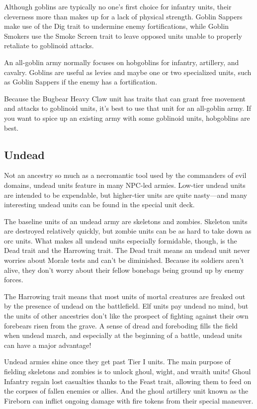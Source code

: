 \documentclass[10pt,a4paper,twoside,bg=print,twocolumn,openany,nodeprecatedcode]{dndbook}
\begin{document}
Although goblins are typically no one's first choice for infantry units, their cleverness more than makes up for a lack of physical strength. Goblin Sappers make use of the Dig trait to undermine enemy fortifications, while Goblin Smokers use the Smoke Screen trait to leave opposed units unable to properly retaliate to goblinoid attacks.

An all-goblin army normally focuses on hobgoblins for infantry, artillery, and cavalry. Goblins are useful as levies and maybe one or two specialized units, such as Goblin Sappers if the enemy has a fortification.

Because the Bugbear Heavy Claw unit has traits that can grant free movement and attacks to goblinoid units, it's best to use that unit for an all-goblin army. If you want to spice up an existing army with some goblinoid units, hobgoblins are best.

\subsection{Undead}
Not an ancestry so much as a necromantic tool used by the commanders of evil domains, undead units feature in many NPC-led armies. Low-tier undead units are intended to be expendable, but higher-tier units are quite nasty—and many interesting undead units can be found in the special unit deck.

The baseline units of an undead army are skeletons and zombies. Skeleton units are destroyed relatively quickly, but zombie units can be as hard to take down as orc units. What makes all undead units especially formidable, though, is the Dead trait and the Harrowing trait. The Dead trait means an undead unit never worries about Morale tests and can't be diminished. Because its soldiers aren't alive, they don't worry about their fellow bonebags being ground up by enemy forces.

The Harrowing trait means that most units of mortal creatures are freaked out by the presence of undead on the battlefield. Elf units pay undead no mind, but the units of other ancestries don't like the prospect of fighting against their own forebears risen from the grave. A sense of dread and foreboding fills the field when undead march, and especially at the beginning of a battle, undead units can have a major advantage!

Undead armies shine once they get past Tier I units. The main purpose of fielding skeletons and zombies is to unlock ghoul, wight, and wraith units! Ghoul Infantry regain lost casualties thanks to the Feast trait, allowing them to feed on the corpses of fallen enemies or allies. And the ghoul artillery unit known as the Fireborn can inflict ongoing damage with fire tokens from their special maneuver.
\end{document}
